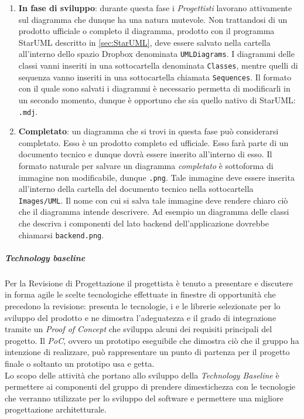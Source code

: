 			
			\begin{enumerate}
				\item \textbf{In fase di sviluppo}: durante questa fase i \emph{Progettisti} lavorano attivamente sul diagramma che dunque ha una natura mutevole. Non trattandosi di un prodotto ufficiale o completo il diagramma, prodotto con il programma StarUML descritto in \ref{sec:StarUML}, deve essere salvato nella cartella all'interno dello spazio Dropbox denominata \texttt{UMLDiagrams}. I diagrammi delle classi vanni inseriti in una sottocartella denominata \texttt{Classes}, mentre quelli di sequenza vanno inseriti in una sottocartella chiamata \texttt{Sequences}. Il formato con il quale sono salvati i diagrammi è necessario permetta di modificarli in un secondo momento, dunque è opportuno che sia quello nativo di StarUML: \texttt{.mdj}.
				\item \textbf{Completato}: un diagramma che si trovi in questa fase può considerarsi completato. Esso è un prodotto completo ed ufficiale. Esso farà parte di un documento tecnico e dunque dovrà essere inserito all'interno di esso. Il formato naturale per salvare un diagramma \emph{completato} è sottoforma di immagine non modificabile, dunque \texttt{.png}. Tale immagine deve essere inserita all'interno della cartella del documento tecnico nella sottocartella \texttt{Images/UML}. Il nome con cui si salva tale immagine deve rendere chiaro ciò che il diagramma intende descrivere. Ad esempio un diagramma delle classi che descriva i componenti del lato backend dell'applicazione dovrebbe chiamarsi \texttt{backend.png}.
			\end{enumerate}
		
		
			\subparagraph{Technology baseline}
			\label{sec:tec}
			\Spazio
			Per la Revisione di Progettazione il progettista è tenuto a presentare e discutere in forma agile le scelte tecnologiche effettuate in finestre di opportunità che precedono la revisione: presenta le tecnologie, i  e le librerie selezionate per lo sviluppo del prodotto e ne dimostra l'adeguatezza e il grado di integrazione tramite un \textit{Proof of Concept} che sviluppa alcuni dei requisiti principali del progetto. Il \textit{PoC}, ovvero un prototipo eseguibile che dimostra ciò che il gruppo ha intenzione di realizzare, può rappresentare un punto di partenza per il progetto finale o soltanto un prototipo usa e getta.\\
			Lo scopo delle attività che portano allo sviluppo della \textit{Technology Baseline} è permettere ai componenti del gruppo di prendere dimestichezza con le tecnologie che verranno utilizzate per lo sviluppo del software e permettere una migliore progettazione architetturale.

